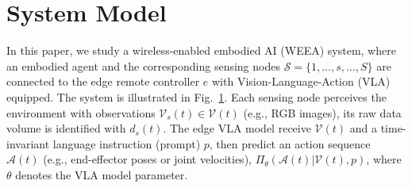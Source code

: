\documentclass[lettersize,journal]{IEEEtran}
\theoremstyle{custom}
\begin{document}
\section{System Model}
In this paper, we study a wireless-enabled embodied AI (WEEA) system, where an embodied agent and the corresponding sensing nodes $\mathcal{S} = \{1, \ldots, s, \ldots, S\}$ are connected to the edge remote controller $e$ with Vision-Language-Action (VLA) equipped. 
The system is illustrated in Fig.~\ref{}. Each sensing node perceives the environment with observations $\mathcal{V}_s(t) \in \mathcal{V}(t)$ (e.g., RGB images), its raw data volume is identified with $d_s(t)$. The edge VLA model receive $\mathcal{V}(t)$ and a time-invariant language instruction (prompt) $p$, then predict an action sequence $\mathcal{A}(t)$ (e.g., end-effector poses or joint velocities), $\Pi_\theta(\mathcal{A}(t) \vert \mathcal{V}(t), p)$, where $\theta$ denotes the VLA model parameter. 


\end{document}

